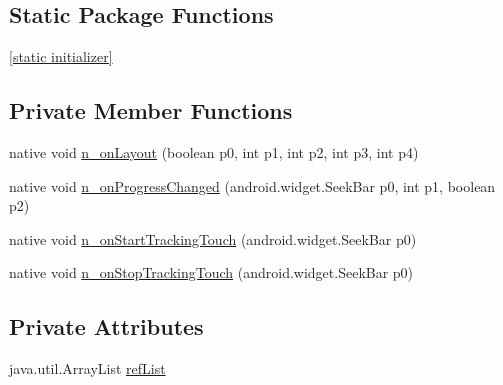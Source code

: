 \subsection*{Static Package Functions}
\begin{CompactItemize}
\item 
\hyperlink{classmd5b60ffeb829f638581ab2bb9b1a7f4f3f_1_1_slider_renderer_f81699d519e8b12712e3907d06e2b81e}{\mbox{[}static initializer\mbox{]}}
\end{CompactItemize}
\subsection*{Private Member Functions}
\begin{CompactItemize}
\item 
native void \hyperlink{classmd5b60ffeb829f638581ab2bb9b1a7f4f3f_1_1_slider_renderer_77b7da7854dd07e25a132e99b1f712ad}{n\_\-onLayout} (boolean p0, int p1, int p2, int p3, int p4)
\item 
native void \hyperlink{classmd5b60ffeb829f638581ab2bb9b1a7f4f3f_1_1_slider_renderer_48491426a16d1d4462c9101a1aab8b4e}{n\_\-onProgressChanged} (android.widget.SeekBar p0, int p1, boolean p2)
\item 
native void \hyperlink{classmd5b60ffeb829f638581ab2bb9b1a7f4f3f_1_1_slider_renderer_2ee7717dd05e5df6b6ecce7b38531ede}{n\_\-onStartTrackingTouch} (android.widget.SeekBar p0)
\item 
native void \hyperlink{classmd5b60ffeb829f638581ab2bb9b1a7f4f3f_1_1_slider_renderer_432e06931257e3032239761823cb6329}{n\_\-onStopTrackingTouch} (android.widget.SeekBar p0)
\end{CompactItemize}
\subsection*{Private Attributes}
\begin{CompactItemize}
\item 
java.util.ArrayList \hyperlink{classmd5b60ffeb829f638581ab2bb9b1a7f4f3f_1_1_slider_renderer_9a55916f662fc8ad22d378850e0c8e13}{refList}
\end{CompactItemize}


